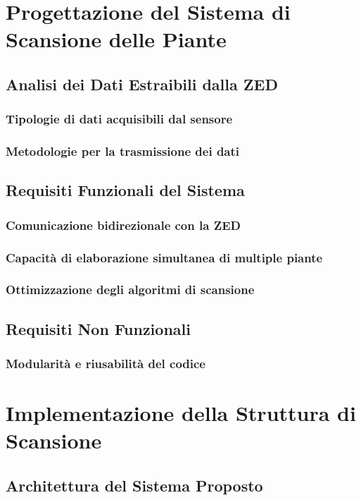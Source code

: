 \documentclass[12pt,a4paper,twoside,openright]{book}
\begin{document}
	
	
	\chapter{Progettazione del Sistema di Scansione delle Piante}
	\section{Analisi dei Dati Estraibili dalla ZED}
	\subsection{Tipologie di dati acquisibili dal sensore}
	\subsection{Metodologie per la trasmissione dei dati}
	
	\section{Requisiti Funzionali del Sistema}
	\subsection{Comunicazione bidirezionale con la ZED}
	\subsection{Capacità di elaborazione simultanea di multiple piante}
	\subsection{Ottimizzazione degli algoritmi di scansione}
	
	\section{Requisiti Non Funzionali}
	\subsection{Modularità e riusabilità del codice}
	
	\chapter{Implementazione della Struttura di Scansione}
	\section{Architettura del Sistema Proposto}
\end{document}
